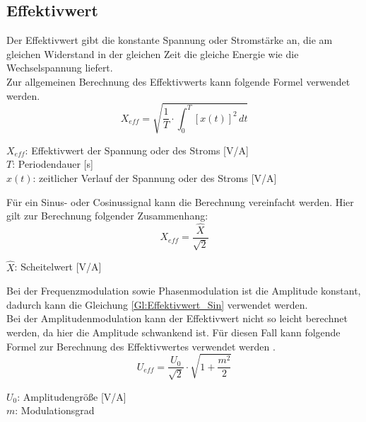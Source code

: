 \documentclass[12pt]{scrartcl}
\begin{document}
\subsection{Effektivwert}
\label{Kp:TG_Effektivwert}
Der Effektivwert gibt die konstante Spannung oder Stromstärke an, die am gleichen Widerstand in der gleichen Zeit die gleiche Energie wie die Wechselspannung liefert.\\
Zur allgemeinen Berechnung des Effektivwerts kann folgende Formel verwendet werden.
\begin{equation}
    X_{eff}=\sqrt{\frac{1}{T}\cdot\int_{0}^{T} \left[x(t)\right]^2 \,dt }
    \label{Gl:Effektivwert_Grundlagen}
\end{equation}
\begin{center} 
    $X_{eff} $: Effektivwert der Spannung oder des Stroms [V/A]\\
    $T$: Periodendauer [s]\\
    $x(t)$: zeitlicher Verlauf der Spannung oder des Stroms [V/A]
\end{center}
Für ein Sinus- oder Cosinussignal kann die Berechnung vereinfacht werden. 
Hier gilt zur Berechnung folgender Zusammenhang:
\begin{equation}
    X_{eff}=\frac{\hat{X}}{\sqrt{2}}
    \label{Gl:Effektivwert_Sin}
\end{equation}
\begin{center}
    $\hat{X}$: Scheitelwert [V/A]
\end{center}
Bei der Frequenzmodulation sowie Phasenmodulation ist die Amplitude konstant, dadurch kann die Gleichung \ref{Gl:Effektivwert_Sin} verwendet werden.\\
Bei der Amplitudenmodulation kann der Effektivwert nicht so leicht berechnet werden, da hier die Amplitude schwankend ist. 
Für diesen Fall kann folgende Formel zur Berechnung des Effektivwertes verwendet werden \cite{Ampl_eff}.
\begin{equation}
    U_{eff}=\frac{U_0}{\sqrt{2}} \cdot \sqrt{1+\frac{m^2}{2}} 
\end{equation}
\begin{center}
    $U_0$: Amplitudengröße [V/A]\\
    $m$: Modulationsgrad
\end{center}
\end{document}
